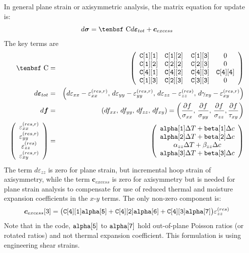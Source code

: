 \documentclass[11pt]{book}
\renewcommand{\vec}[1]{\boldsymbol{#1}}
\def\a#1{\alpha_{#1}}
\def\b#1{\beta_{#1}}
\def\C{\hbox{\tenbsf C}}
\def\cex{\vec{c}_{excess}}
\def\code#1{{\small\tt #1}}
\def\deff{d \vec{\varepsilon}_{tot}}
\def\df{d \vec{f}}
\def\dsig{d \vec{\sigma}}
\def\DT{\Delta T}
\def\e#1{\varepsilon_{#1}}
\def\er#1{\varepsilon_{#1}^{(res)}}
\def\err#1{\varepsilon_{#1}^{(res,r)}}
\def\g#1{\gamma_{#1}}
\begin{document}
In general plane strain or axisymmetric analysis, the matrix equation for update is:
\begin{equation}
    \dsig = \C \deff +\cex
\end{equation}
The key terms are
\begin{eqnarray}
      \C & = & \left(\begin{array}{cccc} \code{C[1][1]}  & \code{C[1][2]}  & \thinspace\code{C[1][3]}  & 0   \\
                    \code{C[1][2]}  & \code{C[2][2]}  & \thinspace\code{C[2][3]}  & 0 \\
                            \code{C[4][1]}  & \code{C[4][2]}  & \thinspace\code{C[4][3]}  & \code{C[4][4]}  \\
                 \code{C[1][3]}  & \code{C[2][3]}  & \thinspace\code{C[3][3]}  & 0 \end{array}\right)  \\
      \deff & = & \left(d\e{xx} - \err{xx}, \thinspace d\e{yy} - \err{yy}, \thinspace d\e{zz} -  \er{zz}, 
              \thinspace d\g{xy}-\err{xy}\right) \\
      \df & = & (df_{xx}, \thinspace df_{yy}, \thinspace df_{zz}, \thinspace df_{xy})
                  = \left({\partial f\over \sigma_{xx}}, \thinspace {\partial f\over \sigma_{yy}}, \thinspace {\partial f\over \sigma_{zz}},
                                {\partial f\over \tau_{xy}}\right)  \\
\left(\begin{array}{c} \err{xx} \\ \err{yy} \\ \er{zz} \\ \err{xy} \end{array}\right)
       & = &  \left(\begin{array}{c}
	\code{alpha[1]}\DT + \code{beta[1]}\Delta c \\
	\code{alpha[2]}\DT + \code{beta[2]}\Delta c \\
	\a{zz}\DT + \b{zz}\Delta c \\
	\code{alpha[3]}\DT + \code{beta[3]}\Delta c  \end{array}\right) 
 \end{eqnarray}
The term $d\e{zz}$ is zero for plane strain, but incremental hoop strain of axisymmetry, while the term $\cex$ is zero for axisymmetry but is needed for plane strain analysis to compensate for use of reduced thermal and moisture expansion coefficients in the $x$-$y$ terms. The only non-zero component is:
\begin{equation}
      \cex[3] = \bigl(\code{C[4][1]}\code{alpha[5]}
              + \code{C[4][2]}\code{alpha[6]}+\code{C[4][3]}\code{alpha[7]}\bigr)\er{zz} 
\end{equation}
Note that in the code, $\code{alpha[5]}$ to $\code{alpha[7]}$ hold out-of-plane Poisson ratios (or rotated ratios) and not thermal expansion coefficient.
This formulation is using engineering shear strains. 
 
\end{document}
